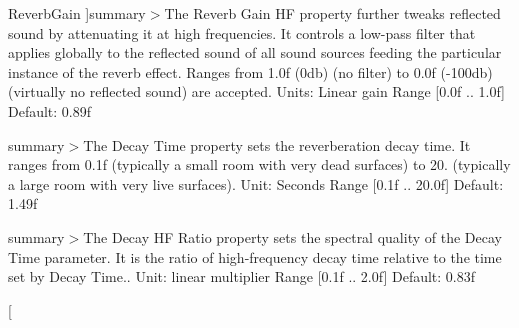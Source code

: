 \begin{Desc}
\begin{description}
{\hypertarget{namespace_open_t_k_1_1_audio_1_1_open_a_l_aa0356299908369b4365d28572c0ec20bac7988492860bf468c1be6f7da59d1722}{Reverb\-Gain}\label{namespace_open_t_k_1_1_audio_1_1_open_a_l_aa0356299908369b4365d28572c0ec20bac7988492860bf468c1be6f7da59d1722}
}]summary$>$The Reverb Gain H\-F property further tweaks reflected sound by attenuating it at high frequencies. It controls a low-\/pass filter that applies globally to the reflected sound of all sound sources feeding the particular instance of the reverb effect. Ranges from 1.\-0f (0db) (no filter) to 0.\-0f (-\/100db) (virtually no reflected sound) are accepted. Units\-: Linear gain Range \mbox{[}0.\-0f .. 1.\-0f\mbox{]} Default\-: 0.\-89f\item[{\em 
\hypertarget{namespace_open_t_k_1_1_audio_1_1_open_a_l_aa0356299908369b4365d28572c0ec20ba85b4782d7ca3ac56d6f8c211fb98cd92}{Reverb\-Gain\-H\-F}\label{namespace_open_t_k_1_1_audio_1_1_open_a_l_aa0356299908369b4365d28572c0ec20ba85b4782d7ca3ac56d6f8c211fb98cd92}
}]summary$>$The Decay Time property sets the reverberation decay time. It ranges from 0.\-1f (typically a small room with very dead surfaces) to 20. (typically a large room with very live surfaces). Unit\-: Seconds Range \mbox{[}0.\-1f .. 20.\-0f\mbox{]} Default\-: 1.\-49f\item[{\em 
\hypertarget{namespace_open_t_k_1_1_audio_1_1_open_a_l_aa0356299908369b4365d28572c0ec20ba648b5b1b867392c46cbaa2ce40e90389}{Reverb\-Decay\-Time}\label{namespace_open_t_k_1_1_audio_1_1_open_a_l_aa0356299908369b4365d28572c0ec20ba648b5b1b867392c46cbaa2ce40e90389}
}]summary$>$The Decay H\-F Ratio property sets the spectral quality of the Decay Time parameter. It is the ratio of high-\/frequency decay time relative to the time set by Decay Time.. Unit\-: linear multiplier Range \mbox{[}0.\-1f .. 2.\-0f\mbox{]} Default\-: 0.\-83f\item[{\em 
}
\end{description}
\end{Desc}
